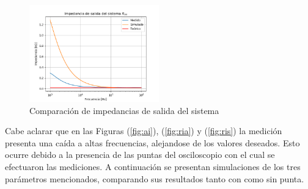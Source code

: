\begin{figure}[H]
\centering
	\includegraphics[width=0.5\textwidth]{Imagenes/Ros.png}
	\caption{Comparación de impedancias de salida del sistema}
	\label{fig:ro}
\end{figure}

Cabe aclarar que en las Figuras (\ref{fig:ai}), (\ref{fig:ria}) y (\ref{fig:ris}) la medición presenta una caída a altas frecuencias, alejandose de los valores deseados. Esto ocurre debido a la presencia de las puntas del osciloscopio con el cual se efectuaron las mediciones. A continuación se presentan simulaciones de los tres parámetros mencionados, comparando sus resultados tanto con como sin punta.
